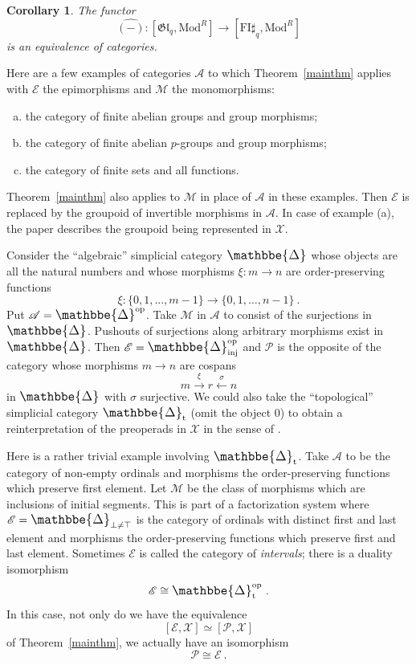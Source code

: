 \documentclass[a4paper,12pt,reqno]{amsart}
\def\makebigger#1#2#3{\hbox{#1$\mathsurround=0pt #2{#3}$}}
\def\bigger#1#2{{\relax\mathpalette{\makebigger#1}{#2}}}
\newcommand{\DelCat}{{\bigger\large{\mathbbe{\Delta}}}}
\newtheorem{corollary}[theorem]{Corollary}
\theoremstyle{definition}
\theoremstyle{fact}
\theoremstyle{genquest}
\theoremstyle{step}
\newcommand{\lra}{\longrightarrow}
\newcommand{\lla}{\longleftarrow}
\def\CA{{\mathscr A}}
\def\CE{{\mathscr E}}
\def\CM{{\mathscr M}}
\def\CP{{\mathscr P}}
\def\CX{{\mathscr X}}
\begin{document}
\begin{corollary} The functor
$$\widehat{(-)} : [\mathfrak{Gl}_q, \mathrm{Mod}^R] \lra [\mathrm{FI}\sharp_q, \mathrm{Mod}^R]$$
is an equivalence of categories.
\end{corollary}   

Here are a few examples of categories $\CA$ to which 
Theorem~\ref{mainthm} applies with $\CE$ 
the epimorphisms and $\CM$ the monomorphisms:
\begin{enumerate}[(a)]
\item the category of finite abelian groups and group morphisms;
\item the category of finite abelian $p$-groups and group morphisms;
\item the category of finite sets and all functions.
\end{enumerate}
Theorem~\ref{mainthm} also applies to $\CM$ in place of $\CA$
in these examples. Then $\CE$ is replaced by the groupoid of
invertible morphisms in $\CA$. In case of example (a),
the paper \cite{HillarDarren2007} describes the groupoid being represented in $\CX$. 

Consider the ``algebraic'' simplicial category $\DelCat$ 
whose objects are all the natural numbers and 
whose morphisms $\xi : m\lra n$ are order-preserving functions 
$$\xi : \{0, 1, \dots , m-1\}\lra \{0, 1, \dots , n-1\} \ .$$
Put $\CA = \DelCat^{\mathrm{op}}$.
Take $\CM$ in $\CA$ to consist of the surjections in $\DelCat$.
Pushouts of surjections along arbitrary morphisms exist in 
$\DelCat$. 
Then $\CE = \DelCat_{\mathrm{inj}}^{\mathrm{op}}$
and $\CP$ is the opposite of the category whose morphisms
$m\lra n$ are cospans $$m\stackrel{\xi}\lra r \stackrel{\sigma}\lla n$$
in $\DelCat$ with $\sigma$ surjective. 
We could also take the ``topological'' simplicial category 
$\DelCat_{\mathrm{t}}$ (omit the object $0$) to obtain
a reinterpretation of the preoperads in $\CX$ in the sense of 
\cite{Berger1996}.

Here is a rather trivial example involving $\DelCat_{\mathrm{t}}$.
Take $\CA$ to be the category of non-empty ordinals and morphisms
the order-preserving functions which preserve first element.
Let $\CM$ be the class of morphisms which are inclusions of
initial segments. This is part of a factorization system where
$\CE = \DelCat_{\bot \neq \top}$ is the category of ordinals with 
distinct first and last element 
and morphisms the order-preserving functions which preserve first 
and last element. Sometimes $\CE$ is called the category of {\em intervals}; there is a duality isomorphism
$$\CE \cong \DelCat_{\mathrm{t}}^{\mathrm{op}} \ .$$ 
In this case, not only do we have the equivalence
$$[\CE, \CX] \simeq [\CP, \CX] $$
of Theorem~\ref{mainthm}, we actually have an isomorphism
$$\CP \cong \CE \ .$$
\end{document}
